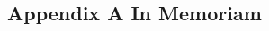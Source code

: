 \documentclass[class=book, crop=false]{standalone}
\begin{document}
\begin{CJK}{UTF8}{gbsn}

\chapter*{Appendix A In Memoriam}



\cleardoublepage

\end{CJK}
\end{document}
